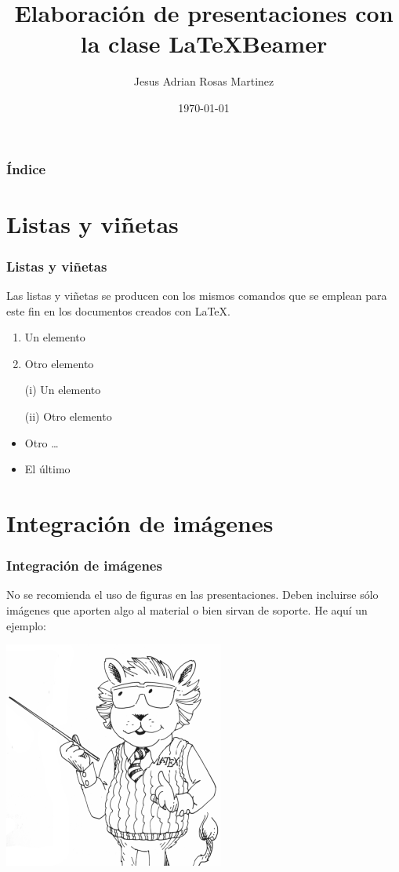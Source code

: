 \documentclass[xcolor=pdftex,dvinames,table]{beamer}
\title{Elaboración de presentaciones con la clase \LaTeX Beamer}
\author{Jesus Adrian Rosas Martinez}
\date{\today}
\begin{document}
\frame{\titlepage}
\begin{frame}
\frametitle{Índice} 
\tableofcontents %
\end{frame}
\section{Listas y viñetas}%
\begin{frame}
\frametitle{Listas y viñetas}
Las listas y viñetas se producen con los mismos comandos que se emplean para este fin en los documentos creados con \LaTeX.\\
\begin{enumerate}
\item Un elemento
\item Otro elemento
\end{enumerate}
\begin{itemize}
	\item [(i)] Un elemento
	\item [(ii)] Otro elemento\\
	\item Otro \ldots
	\item El último
\end{itemize}
\end{frame}%

\section{Integración de imágenes}%
\begin{frame}
\frametitle{Integración de imágenes}
No se recomienda el uso de figuras en las presentaciones. Deben incluirse sólo imágenes que aporten algo al material o bien sirvan de soporte. He aquí un ejemplo:
\begin{center}
\includegraphics{LaTeXlion2.png}
\end{center}
\end{frame}
\end{document}
